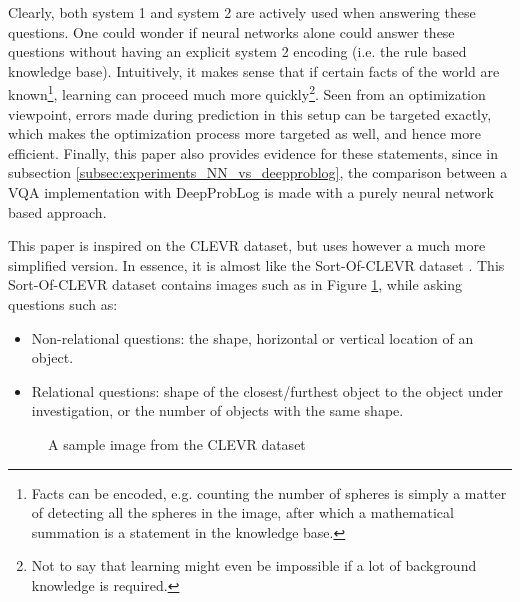 \documentclass[english]{sobraep}
\begin{document}
Clearly, both system 1 and system 2 are actively used when answering these questions. One could wonder if neural networks alone could answer these questions without having an explicit system 2 encoding (i.e. the rule based knowledge base). Intuitively, it makes sense that if certain facts of the world are known\footnote{Facts can be encoded, e.g. counting the number of spheres is simply a matter of detecting all the spheres in the image, after which a mathematical summation is a statement in the knowledge base.}, learning can proceed much more quickly\footnote{Not to say that learning might even be impossible if a lot of background knowledge is required.}. Seen from an optimization viewpoint, errors made during prediction in this setup can be targeted exactly, which makes the optimization process more targeted as well, and hence more efficient. Finally, this paper also provides evidence for these statements, since in subsection \ref{subsec:experiments_NN_vs_deepproblog}, the comparison between a VQA implementation with DeepProbLog is made with a purely neural network based approach. 

This paper is inspired on the CLEVR dataset, but uses however a much more simplified version. In essence, it is almost like the Sort-Of-CLEVR dataset \cite{sort_of_clevr_dataset}. This Sort-Of-CLEVR dataset contains images such as in Figure \ref{fig:sample_image_sort_of_clevr}, while asking questions such as:
\begin{itemize}
    \item Non-relational questions: the shape, horizontal or vertical location of an object.
    \item Relational questions: shape of the closest/furthest object to the object under investigation, or the number of objects with the same shape.
\end{itemize}

\begin{figure}[htp]
    \begin{center}
    \captionsetup{justification=centering}
    \caption{A sample image from the CLEVR dataset \cite{sort_of_clevr_dataset}}
    \label{fig:sample_image_sort_of_clevr}
    \end{center}
\end{figure}
\end{document}
